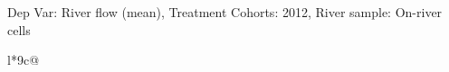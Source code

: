 \begin{table}[H]
\captionlistentry[table]{}
\label{table:beaver_hydrometry_DVflow_mean_SCg1}
\tiny %
Dep Var: River flow (mean), Treatment Cohorts: 2012, River sample: On-river cells \\
\begin{threeparttable}
\begin{tabulary}{\textwidth}{l*{9}{c}@{}}
\toprule \toprule
\noalign{\smallskip}
\noalign{\smallskip}
\midrule \bottomrule
\end{tabulary}
\medskip
\end{threeparttable}
\end{table}
